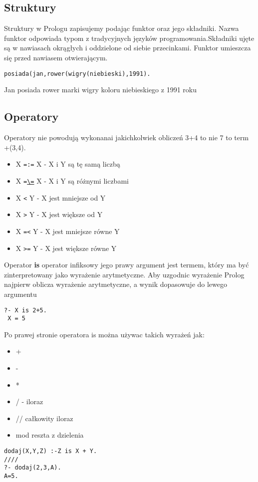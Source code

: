 \documentclass{article}
\begin{document}
\subsection{Struktury}
Struktury w Prologu zapisujemy podając funktor oraz jego składniki. Nazwa funktor odpowiada typom z tradycyjnych języków programowania.Składniki ujęte są w nawiasach okrągłych i oddzielone od siebie przecinkami. Funktor umieszcza się przed nawiasem otwierającym.
\begin{lstlisting}[caption = Strukturę można rozbudowywać]
posiada(jan,rower(wigry(niebieski),1991).

\end{lstlisting}


Jan posiada rower marki wigry koloru niebieskiego z 1991 roku
\subsection{Operatory}
Operatory nie powodują wykonanai jakichkolwiek obliczeń 3+4 to nie 7 to term +(3,4).
\begin{itemize}
\item X \texttt{=:=} X  - X i Y są tę samą liczbą
\item X \texttt{=\url{\=}} X  - X i Y są różnymi liczbami
\item X \texttt{<} Y - X jest mniejsze od Y
\item X \texttt{>} Y  - X jest większe od Y
\item X \texttt{=<} Y  - X jest mniejsze równe Y
\item X \texttt{>=} Y  - X jest większe równe Y
\end{itemize}
Operator \textbf{is} operator infiksowy jego prawy argument jest termem, który ma być zinterpretowany jako wyrażenie arytmetyczne. Aby uzgodnic wyrażenie Prolog najpierw oblicza wyrażenie arytmetyczne, a wynik dopasowuje do lewego argumentu
\begin{lstlisting}[caption=Operator "is"]
 ?- X is 2+5.
 X = 5

\end{lstlisting}
Po prawej stronie operatora is można używac takich wyrażeń jak:
\begin{itemize}
\item +
\item -
\item *
\item / - iloraz
\item // całkowity iloraz
\item mod reszta z dzielenia
\end{itemize}
\begin{lstlisting}[caption=Dodawanie]
dodaj(X,Y,Z) :-Z is X + Y.
////
?- dodaj(2,3,A).
A=5.
\end{lstlisting}
\end{document}
